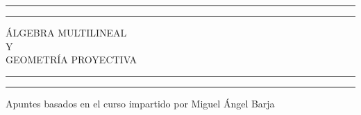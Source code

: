 \newcommand{\plogo}{\fbox{$\mathcal{PL}$}} %

\begin{titlepage} %

    \centering %

    \scshape %

    \vspace*{5\baselineskip} %


    \rule{\textwidth}{1.6pt}\vspace*{-\baselineskip}\vspace*{2pt} %
    \rule{\textwidth}{0.4pt} %

    \vspace{0.75\baselineskip} %

    {\LARGE ÁLGEBRA MULTILINEAL\\ Y\\ GEOMETRÍA PROYECTIVA\\} %

    \vspace{0.75\baselineskip} %

    \rule{\textwidth}{0.4pt}\vspace*{-\baselineskip}\vspace{3.2pt} %
    \rule{\textwidth}{1.6pt} %

    \vspace{1.5\baselineskip} %


    Apuntes basados en el curso impartido por Miguel Ángel Barja

    \vspace*{1\baselineskip} %





\end{titlepage}
